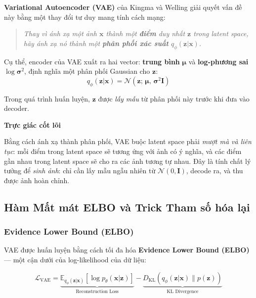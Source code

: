 \textbf{Variational Autoencoder (VAE)} \cite{Kingma2014} của Kingma và Welling giải quyết vấn đề này bằng một thay đổi tư duy mang tính cách mạng:

\begin{quote}
    \textit{Thay vì ánh xạ một ảnh $\mathbf{x}$ thành một \textbf{điểm} duy nhất $\mathbf{z}$ trong latent space, hãy ánh xạ nó thành một \textbf{phân phối xác suất} $q_\phi(\mathbf{z}|\mathbf{x})$.}
\end{quote}

Cụ thể, encoder của VAE xuất ra hai vector: \textbf{trung bình} $\boldsymbol{\mu}$ và \textbf{log-phương sai} $\log \boldsymbol{\sigma}^2$, định nghĩa một phân phối Gaussian cho $\mathbf{z}$:
\[
    q_\phi(\mathbf{z}|\mathbf{x}) = \mathcal{N}(\mathbf{z};\, \boldsymbol{\mu},\, \boldsymbol{\sigma}^2 \mathbf{I})
\]

Trong quá trình huấn luyện, $\mathbf{z}$ được \textit{lấy mẫu} từ phân phối này trước khi đưa vào decoder.

\begin{mdframed}[style=infobox]
    \textbf{Trực giác cốt lõi}

    Bằng cách ánh xạ thành phân phối, VAE buộc latent space phải \textit{mượt mà và liên tục}: mỗi điểm trong latent space sẽ tương ứng với ảnh có ý nghĩa, và các điểm gần nhau trong latent space sẽ cho ra các ảnh tương tự nhau. Đây là tính chất lý tưởng để \textit{sinh ảnh}: chỉ cần lấy mẫu ngẫu nhiên từ $\mathcal{N}(0, \mathbf{I})$, decode ra, và thu được ảnh hoàn chỉnh.
\end{mdframed}

\subsection{Hàm Mất mát ELBO và Trick Tham số hóa lại}
\label{subsec:vae_elbo}

\subsubsection{Evidence Lower Bound (ELBO)}
\label{subsubsec:elbo}

VAE được huấn luyện bằng cách tối đa hóa \textbf{Evidence Lower Bound (ELBO)} — một cận dưới của log-likelihood của dữ liệu:

\begin{equation}
    \mathcal{L}_{\text{VAE}} = \underbrace{\mathbb{E}_{q_\phi(\mathbf{z}|\mathbf{x})}\left[\log p_\theta(\mathbf{x}|\mathbf{z})\right]}_{\text{Reconstruction Loss}} - \underbrace{D_{\text{KL}}\left(q_\phi(\mathbf{z}|\mathbf{x}) \| p(\mathbf{z})\right)}_{\text{KL Divergence}}
    \label{eq:vae_elbo}
\end{equation}

